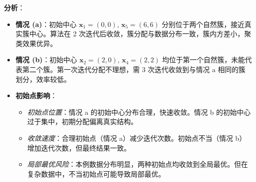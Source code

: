 \documentclass{article}
\begin{document}
\textbf{分析}：
\begin{itemize}
    \item \textbf{情况 (a)}：初始中心 \( \mathbf{x}_1 = (0, 0) \), \( \mathbf{x}_5 = (6, 6) \) 分别位于两个自然簇，接近真实簇中心。算法在 2 次迭代后收敛，簇分配与数据分布一致，簇内方差小，聚类效果优异。
    \item \textbf{情况 (b)}：初始中心 \( \mathbf{x}_2 = (2, 0) \), \( \mathbf{x}_4 = (2, 2) \) 均位于第一个自然簇，未能代表第二个簇。第一次迭代分配不理想，需 3 次迭代收敛到与情况 a 相同的簇划分，效率较低。
    \item \textbf{初始点影响}：
    \begin{itemize}
        \item \emph{初始点位置}：情况 a 的初始中心分布合理，快速收敛。情况 b 的初始中心过于集中，初期分配偏离真实结构。
        \item \emph{收敛速度}：合理初始点（情况 a）减少迭代次数。初始点不当（情况 b）增加迭代次数，但最终结果一致。
        \item \emph{局部最优风险}：本例数据分布明显，两种初始点均收敛到全局最优。但在复杂数据中，不当初始点可能导致局部最优。
    \end{itemize}
\end{itemize}
\end{document}
